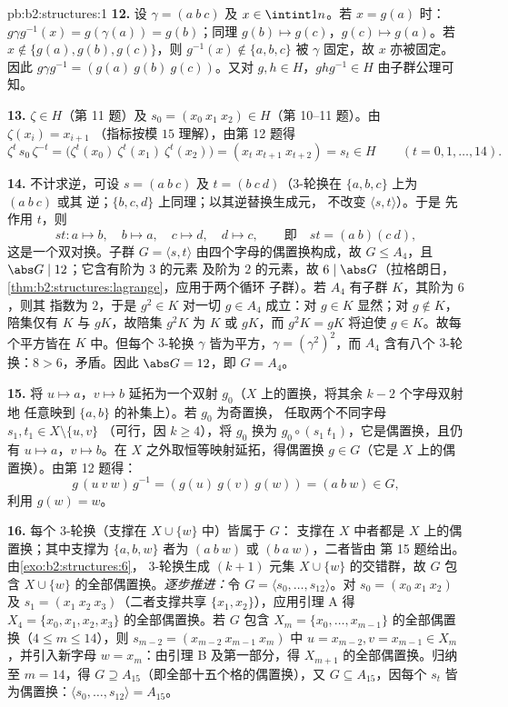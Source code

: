 \begin{solution}{pb:b2:structures:1}
\textbf{12.} 设 $\gamma = (a\ b\ c)$ 及 $x \in \intint1n$。若
$x = g(a)$ 时：$g\gamma g^{-1}(x) = g(\gamma(a)) = g(b)$；同理
$g(b) \mapsto g(c)$，$g(c) \mapsto g(a)$。若 $x \notin
\{g(a), g(b), g(c)\}$，则 $g^{-1}(x) \notin \{a,b,c\}$
被 $\gamma$ 固定，故 $x$ 亦被固定。因此 $g\gamma g^{-1} =
(g(a)\ g(b)\ g(c))$。又对 $g, h \in H$，$ghg^{-1} \in H$
由子群公理可知。

\textbf{13.} $\zeta \in H$（第 11 题）及 $s_0 = (x_0\ x_1\
x_2) \in H$（第 10--11 题）。由 $\zeta(x_i) = x_{i+1}$
（指标按模 $15$ 理解），由第 12 题得
\[
\zeta^{t}\,s_0\,\zeta^{-t}
= \bigl(\zeta^t(x_0)\ \zeta^t(x_1)\ \zeta^t(x_2)\bigr)
= (x_t\ x_{t+1}\ x_{t+2}) = s_t \in H
\qquad (t = 0, 1, \dots, 14).
\]

\textbf{14.} 不计求逆，可设 $s = (a\ b\ c)$ 及 $t =
(b\ c\ d)$（$3$-轮换在 $\{a,b,c\}$ 上为 $(a\ b\ c)$ 或其
逆；$\{b,c,d\}$ 上同理；以其逆替换生成元，
不改变 $\langle s, t\rangle$）。于是
先作用 $t$，则
\[
st \colon a \mapsto b,\quad b \mapsto a,\quad c \mapsto d,\quad
d \mapsto c, \qquad\text{即}\quad st = (a\ b)(c\ d),
\]
这是一个双对换。子群 $G = \langle s, t\rangle$
由四个字母的偶置换构成，故 $G \leq
A_4$，且 $\abs G \mid 12$；它含有阶为 $3$ 的元素
及阶为 $2$ 的元素，故 $6 \mid \abs G$（拉格朗日，
\cref{thm:b2:structures:lagrange}，应用于两个循环
子群）。若 $A_4$ 有子群 $K$，其阶为 $6$，则其
指数为 $2$，于是 $g^2 \in K$ 对一切 $g \in A_4$ 成立：对
$g \in K$ 显然；对 $g \notin K$，陪集仅有
$K$ 与 $gK$，故陪集 $g^2K$ 为 $K$ 或 $gK$，而 $g^2K =
gK$ 将迫使 $g \in K$。故每个平方皆在 $K$ 中。但每个
$3$-轮换 $\gamma$ 皆为平方，$\gamma = (\gamma^2)^2$，而
$A_4$ 含有八个 $3$-轮换：$8 > 6$，矛盾。因此
$\abs G = 12$，即 $G = A_4$。

\textbf{15.} 将 $u \mapsto a$，$v \mapsto b$ 延拓为一个双射
$g_0$（$X$ 上的置换，将其余 $k - 2$ 个字母双射地
任意映到 $\{a, b\}$ 的补集上）。若 $g_0$ 为奇置换，
任取两个不同字母 $s_1, t_1 \in X \setminus \{u, v\}$
（可行，因 $k \geq 4$），将 $g_0$ 换为 $g_0 \circ (s_1\
t_1)$，它是偶置换，且仍有 $u \mapsto a$，$v \mapsto
b$。在 $X$ 之外取恒等映射延拓，得偶置换 $g \in
G$（它是 $X$ 上的偶置换）。由第 12 题得：
\[
g\,(u\ v\ w)\,g^{-1} = (g(u)\ g(v)\ g(w)) = (a\ b\ w) \in G,
\]
利用 $g(w) = w$。

\textbf{16.} 每个 $3$-轮换（支撑在 $X \cup \{w\}$ 中）皆属于 $G$：
支撑在 $X$ 中者都是 $X$ 上的偶置换；其中支撑为
$\{a, b, w\}$ 者为 $(a\ b\ w)$ 或 $(b\ a\ w)$，二者皆由
第 15 题给出。由\cref{exo:b2:structures:6}，
$3$-轮换生成 $(k+1)$ 元集 $X \cup \{w\}$
的交错群，故 $G$ 包含
$X \cup \{w\}$ 的全部偶置换。\emph{逐步推进：}令 $G = \langle s_0, \dots,
s_{12}\rangle$。对 $s_0 = (x_0\ x_1\ x_2)$ 及
$s_1 = (x_1\ x_2\ x_3)$（二者支撑共享 $\{x_1, x_2\}$），应用引理 A 得
$X_4 = \{x_0, x_1, x_2, x_3\}$ 的全部偶置换。若 $G$
包含 $X_m = \{x_0, \dots,
x_{m-1}\}$ 的全部偶置换（$4 \leq m \leq 14$），则 $s_{m-2} = (x_{m-2}\
x_{m-1}\ x_m)$ 中 $u = x_{m-2}, v = x_{m-1} \in X_m$，并引入新字母
$w = x_m$：由引理 B 及第一部分，得
$X_{m+1}$ 的全部偶置换。归纳至 $m = 14$，得 $G \supseteq
A_{15}$（即全部十五个格的偶置换），又 $G
\subseteq A_{15}$，因每个 $s_t$ 皆为偶置换：$\langle s_0, \dots,
s_{12}\rangle = A_{15}$。


\end{solution}
